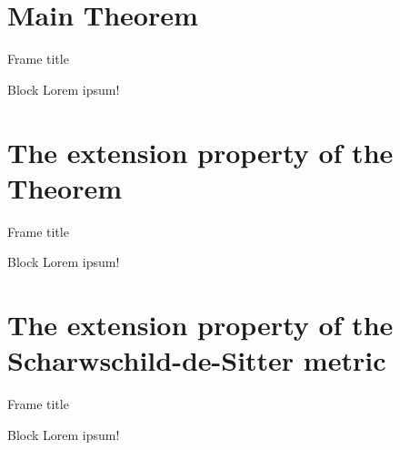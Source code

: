 \documentclass[17pt, t, lualatex]{beamer}
\begin{document}
\section{Main Theorem}

\insertsectionpage

\begin{frame}{Frame title}
\begin{block}{Block}
Lorem ipsum!
\end{block}
\end{frame}


\section{The extension property of the Theorem}

\insertsectionpage

\begin{frame}{Frame title}
\begin{block}{Block}
Lorem ipsum!
\end{block}
\end{frame}

\section{The extension property of the Scharwschild-de-Sitter metric}


\insertsectionpage

\begin{frame}{Frame title}
\begin{block}{Block}
Lorem ipsum!
\end{block}
\end{frame}

\insertendpage
\end{document}
